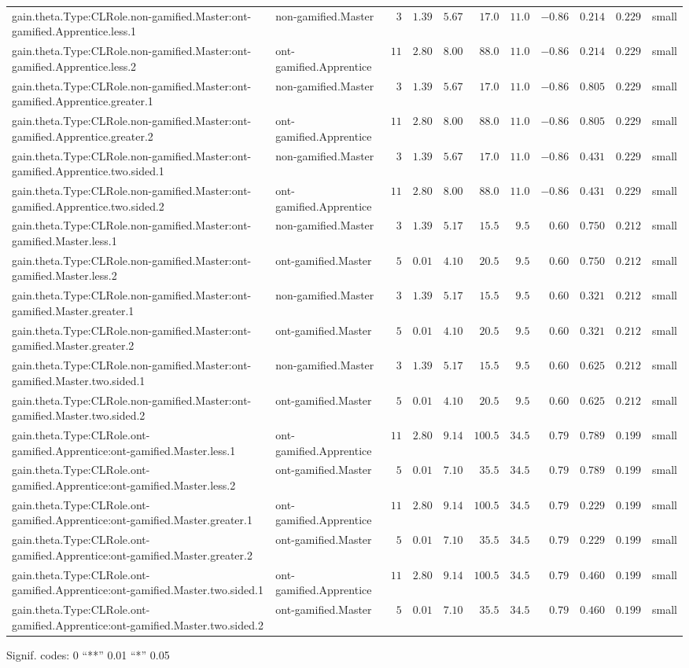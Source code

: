 \documentclass[6pt]{article}
\begin{document}
\begin{landscape}
{\begin{longtable}{llrrrrrrrrl}
gain.theta.Type:CLRole.non-gamified.Master:ont-gamified.Apprentice.less.1&non-gamified.Master&$ 3$&$1.39$&$ 5.67$&$ 17.0$&$ 11.0$&$-0.86$&$0.214$&$0.229$&small\tabularnewline
gain.theta.Type:CLRole.non-gamified.Master:ont-gamified.Apprentice.less.2&ont-gamified.Apprentice&$11$&$2.80$&$ 8.00$&$ 88.0$&$ 11.0$&$-0.86$&$0.214$&$0.229$&small\tabularnewline
gain.theta.Type:CLRole.non-gamified.Master:ont-gamified.Apprentice.greater.1&non-gamified.Master&$ 3$&$1.39$&$ 5.67$&$ 17.0$&$ 11.0$&$-0.86$&$0.805$&$0.229$&small\tabularnewline
gain.theta.Type:CLRole.non-gamified.Master:ont-gamified.Apprentice.greater.2&ont-gamified.Apprentice&$11$&$2.80$&$ 8.00$&$ 88.0$&$ 11.0$&$-0.86$&$0.805$&$0.229$&small\tabularnewline
gain.theta.Type:CLRole.non-gamified.Master:ont-gamified.Apprentice.two.sided.1&non-gamified.Master&$ 3$&$1.39$&$ 5.67$&$ 17.0$&$ 11.0$&$-0.86$&$0.431$&$0.229$&small\tabularnewline
gain.theta.Type:CLRole.non-gamified.Master:ont-gamified.Apprentice.two.sided.2&ont-gamified.Apprentice&$11$&$2.80$&$ 8.00$&$ 88.0$&$ 11.0$&$-0.86$&$0.431$&$0.229$&small\tabularnewline
gain.theta.Type:CLRole.non-gamified.Master:ont-gamified.Master.less.1&non-gamified.Master&$ 3$&$1.39$&$ 5.17$&$ 15.5$&$  9.5$&$ 0.60$&$0.750$&$0.212$&small\tabularnewline
gain.theta.Type:CLRole.non-gamified.Master:ont-gamified.Master.less.2&ont-gamified.Master&$ 5$&$0.01$&$ 4.10$&$ 20.5$&$  9.5$&$ 0.60$&$0.750$&$0.212$&small\tabularnewline
gain.theta.Type:CLRole.non-gamified.Master:ont-gamified.Master.greater.1&non-gamified.Master&$ 3$&$1.39$&$ 5.17$&$ 15.5$&$  9.5$&$ 0.60$&$0.321$&$0.212$&small\tabularnewline
gain.theta.Type:CLRole.non-gamified.Master:ont-gamified.Master.greater.2&ont-gamified.Master&$ 5$&$0.01$&$ 4.10$&$ 20.5$&$  9.5$&$ 0.60$&$0.321$&$0.212$&small\tabularnewline
gain.theta.Type:CLRole.non-gamified.Master:ont-gamified.Master.two.sided.1&non-gamified.Master&$ 3$&$1.39$&$ 5.17$&$ 15.5$&$  9.5$&$ 0.60$&$0.625$&$0.212$&small\tabularnewline
gain.theta.Type:CLRole.non-gamified.Master:ont-gamified.Master.two.sided.2&ont-gamified.Master&$ 5$&$0.01$&$ 4.10$&$ 20.5$&$  9.5$&$ 0.60$&$0.625$&$0.212$&small\tabularnewline
gain.theta.Type:CLRole.ont-gamified.Apprentice:ont-gamified.Master.less.1&ont-gamified.Apprentice&$11$&$2.80$&$ 9.14$&$100.5$&$ 34.5$&$ 0.79$&$0.789$&$0.199$&small\tabularnewline
gain.theta.Type:CLRole.ont-gamified.Apprentice:ont-gamified.Master.less.2&ont-gamified.Master&$ 5$&$0.01$&$ 7.10$&$ 35.5$&$ 34.5$&$ 0.79$&$0.789$&$0.199$&small\tabularnewline
gain.theta.Type:CLRole.ont-gamified.Apprentice:ont-gamified.Master.greater.1&ont-gamified.Apprentice&$11$&$2.80$&$ 9.14$&$100.5$&$ 34.5$&$ 0.79$&$0.229$&$0.199$&small\tabularnewline
gain.theta.Type:CLRole.ont-gamified.Apprentice:ont-gamified.Master.greater.2&ont-gamified.Master&$ 5$&$0.01$&$ 7.10$&$ 35.5$&$ 34.5$&$ 0.79$&$0.229$&$0.199$&small\tabularnewline
\newpage
gain.theta.Type:CLRole.ont-gamified.Apprentice:ont-gamified.Master.two.sided.1&ont-gamified.Apprentice&$11$&$2.80$&$ 9.14$&$100.5$&$ 34.5$&$ 0.79$&$0.460$&$0.199$&small\tabularnewline
gain.theta.Type:CLRole.ont-gamified.Apprentice:ont-gamified.Master.two.sided.2&ont-gamified.Master&$ 5$&$0.01$&$ 7.10$&$ 35.5$&$ 34.5$&$ 0.79$&$0.460$&$0.199$&small\tabularnewline
\hline
\end{longtable}}\end{landscape}
\begin{flushright}{ \tiny{ Signif. codes:  0 ``**'' 0.01 ``*'' 0.05 }}\end{flushright} 
\end{document}

